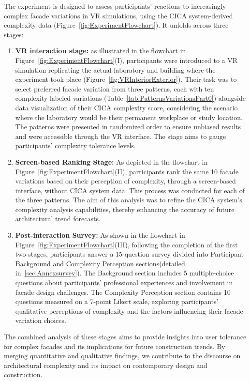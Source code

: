 %    


The experiment is designed to assess participants' reactions to increasingly complex facade variations in VR simulations, using the CICA system-derived complexity data (Figure~\ref{fig:ExperimentFlowchart}). It unfolds across three stages:

\begin{enumerate}
    \item \textbf{VR interaction stage:}  as illustrated in the flowchart in Figure~\ref{fig:ExperimentFlowchart}(I), participants were introduced to a VR simulation replicating the actual laboratory and building where the experiment took place (Figure~\ref{fig:VRInteriorExterior}).
    Their task was to select preferred facade variation from three patterns, each with ten complexity-labeled variations (Table~\ref{tab:PatternsVariationsPart0}) alongside data visualization of their CICA complexity score, considering the scenario where the laboratory would be their permanent workplace or study location.
    The patterns were presented in randomized order to ensure unbiased results and were accessible through the VR interface.
    The stage aims to gauge participants' complexity tolerance levels.
    \item \textbf{Screen-based Ranking Stage:} As depicted in the flowchart in Figure~\ref{fig:ExperimentFlowchart}(II), participants rank the same 10 facade variations based on their perception of complexity, through a screen-based interface, without CICA system data.
    This process was conducted for each of the three patterns.
    The aim of this analysis was to refine the CICA system's complexity analysis capabilities, thereby enhancing the accuracy of future architectural trend forecasts.
    \item \textbf{Post-interaction Survey:} As shown in the flowchart in Figure~\ref{fig:ExperimentFlowchart}(III), following the completion of the first two stages, participants answer a 15-question survey divided into Participant Background and Complexity Perception sections(detailed in~\ref{sec:Annexsurvey}).
    The Background section includes 5 multiple-choice questions about participants' professional experiences and involvement in facade design challenges.
    The Complexity Perception section contains 10 questions measured on a 7-point Likert scale, exploring participants' qualitative perceptions of complexity and the factors influencing their facade variation choices.
\end{enumerate}


The combined analysis of these stages aims to provide insights into user tolerance for complex facades and its implications for future construction trends.
By merging quantitative and qualitative findings, we contribute to the discourse on architectural complexity and its impact on contemporary design and construction.